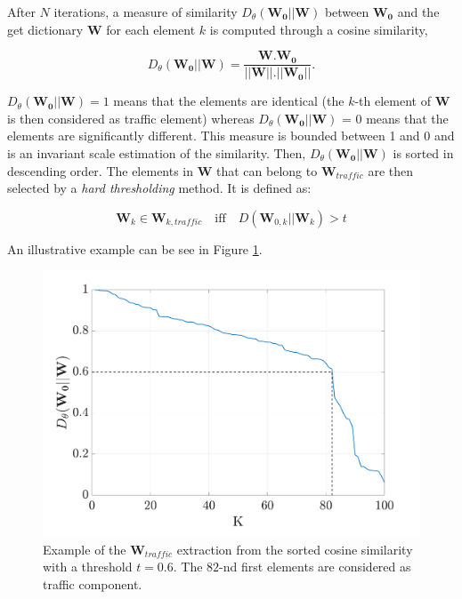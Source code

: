\documentclass[twocolumn,a4paper,10pt]{article}
\begin{document}
After $N$ iterations, a measure of similarity $D_{\theta}\left(\mathbf{W_0} \vert \vert \mathbf{W} \right)$ between $\mathbf{W_0}$ and the get dictionary $\mathbf{W}$ for each element $k$ is computed through a cosine similarity,

\begin{equation}
D_{\theta}\left(\mathbf{W_0} \vert \vert \mathbf{W} \right) = \frac{\mathbf{W}.\mathbf{W_0}}{\vert \vert \mathbf{W}  \vert \vert . \vert \vert \mathbf{W_0} \vert \vert}.
\end{equation}

$D_{\theta}\left(\mathbf{W_0} \vert \vert \mathbf{W} \right) = 1$ means that the elements are identical (the $k$-th element of $\mathbf{W}$ is then considered as traffic element) whereas $D_{\theta}\left(\mathbf{W_0} \vert \vert \mathbf{W} \right)$ = 0 means that the elements are significantly different. This measure is bounded between 1 and 0 and is an invariant scale estimation of the similarity. Then, $D_{\theta}\left(\mathbf{W_0} \vert \vert \mathbf{W} \right)$ is sorted in descending order. The elements in $\mathbf{W}$ that can belong to $\mathbf{W}_{traffic}$ are then selected by a \textit{hard thresholding} method. It is defined as:

\begin{equation}
\mathbf{W}_k \in \mathbf{W}_{k,traffic} \quad \text{iff} \quad D\left(\mathbf{W}_{0,k} \vert \vert \mathbf{W}_{k} \right) > t
\end{equation}

An illustrative example can be see in Figure \ref{fig:W_TI_NMF}.\\

\begin{figure}[hbtp]
\centering
\includegraphics[width=0.8\linewidth]{figures/distanceCosLinDisplay.pdf}
\caption{Example of the $\mathbf{W}_{traffic}$ extraction from the sorted cosine similarity with a threshold $t = 0.6$. The $82$-nd first elements are considered as traffic component.}
\label{fig:W_TI_NMF}
\end{figure}
\end{document}
